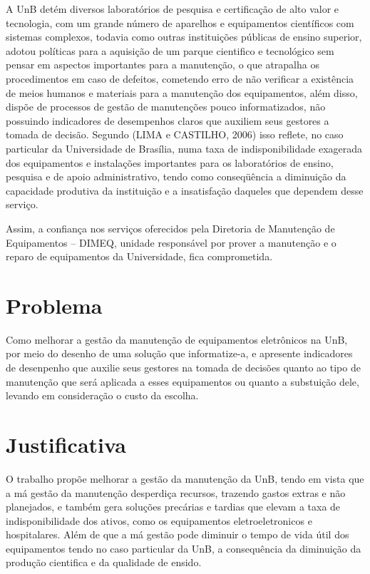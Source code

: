 A UnB detém diversos laboratórios de pesquisa e certificação de alto valor e tecnologia, com um grande número de aparelhos e equipamentos científicos com sistemas complexos, todavia como outras instituições públicas de ensino superior, adotou políticas para a aquisição de um parque cientifico e tecnológico sem pensar em aspectos importantes para a manutenção, o que atrapalha os procedimentos em caso de defeitos, cometendo erro de não verificar a existência de meios humanos e materiais para a manutenção dos equipamentos, além disso, dispõe de processos de gestão de manutenções pouco informatizados, não possuindo indicadores de desempenhos claros que auxiliem seus gestores a tomada de decisão. Segundo (LIMA e CASTILHO, 2006) isso reflete, no caso particular da Universidade de Brasília, numa taxa de indisponibilidade exagerada dos equipamentos e instalações importantes para os laboratórios de ensino, pesquisa e de apoio administrativo, tendo como conseqüência a diminuição da capacidade produtiva da instituição e a insatisfação daqueles que dependem desse serviço.

Assim, a confiança nos serviços oferecidos pela Diretoria de Manutenção de Equipamentos – DIMEQ, unidade responsável por prover a manutenção e o reparo de equipamentos da Universidade, fica comprometida. 









\section{Problema}

Como melhorar a gestão da manutenção de equipamentos eletrônicos na UnB, por meio do desenho de uma solução que informatize-a, e apresente indicadores de desenpenho que auxilie seus gestores na tomada de decisões quanto ao tipo de manutenção que será aplicada a esses equipamentos ou quanto a substuição dele, levando em consideração o custo da escolha. 


\section{Justificativa}

O trabalho propõe melhorar a gestão da manutenção da UnB, tendo em vista que a má gestão da manutenção desperdiça recursos, trazendo gastos extras e não planejados, e também gera soluções precárias e tardias que elevam a taxa de indisponibilidade dos ativos, como os equipamentos eletroeletronicos e hospitalares. Além de que a má gestão pode diminuir o tempo de vida útil dos equipamentos tendo no caso particular da UnB, a consequência da diminuição da produção cientifica e da qualidade de ensido.

